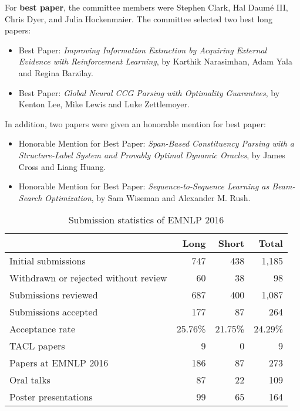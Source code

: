 For {\bf best paper}, the committee members were Stephen Clark, Hal
Daum\'{e} III, Chris Dyer, and Julia Hockenmaier. The committee selected
two best long papers:
\begin{itemize}
\item Best Paper: \emph{Improving Information Extraction by Acquiring External Evidence with Reinforcement Learning}, by Karthik Narasimhan, Adam Yala and Regina Barzilay.
\item Best Paper: \emph{Global Neural CCG Parsing with Optimality
  Guarantees}, by Kenton Lee, Mike Lewis and Luke Zettlemoyer.
\end{itemize}
In addition, two papers were given an honorable mention for best paper:
\begin{itemize}
\item Honorable Mention for Best Paper: \emph{Span-Based Constituency Parsing with a Structure-Label System and Provably Optimal Dynamic Oracles}, by James Cross and Liang Huang.
\item Honorable Mention for Best Paper: \emph{Sequence-to-Sequence
  Learning as Beam-Search Optimization}, by Sam Wiseman and Alexander
  M. Rush.
\end{itemize}


\begin{table}[t]
  \begin{center}
  \begin{tabular}{lrrr}
     & Long & Short & Total \\
    \hline
    Initial submissions                    & 747 & 438 & 1,185 \\
    Withdrawn or rejected without review   &  60 &  38 &    98 \\
    Submissions reviewed                   & 687 & 400 & 1,087 \\
    Submissions accepted                   & 177 &  87 &   264 \\
    Acceptance rate                        & 25.76\% & 21.75\% & 24.29\% \\
    TACL papers                            &   9 &   0 &   9   \\
    Papers at EMNLP 2016 \hskip 2cm        & 186 &  87 &  273  \\         
    Oral talks                             &  87 &  22 &  109  \\
    Poster presentations                   & 99 &  65  & 164  \\
    \hline
  \end{tabular}
  \end{center}
  \caption{Submission statistics of EMNLP 2016}
\end{table}


